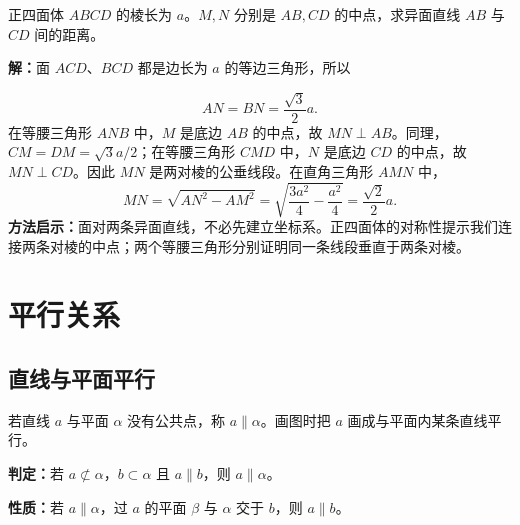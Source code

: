 \begin{examplebox}[补充：正四面体两对棱间的距离]
  正四面体 $ABCD$ 的棱长为 $a$。$M,N$ 分别是 $AB,CD$ 的中点，求异面直线 $AB$ 与 $CD$ 间的距离。

  \begin{center}
  \end{center}

  \textbf{解：}面 $ACD$、$BCD$ 都是边长为 $a$ 的等边三角形，所以

  \[
    AN=BN=\frac{\sqrt3}{2}a.
  \]
  在等腰三角形 $ANB$ 中，$M$ 是底边 $AB$ 的中点，故 $MN\perp AB$。同理，
  $CM=DM=\sqrt3a/2$；在等腰三角形 $CMD$ 中，$N$ 是底边 $CD$ 的中点，故
  $MN\perp CD$。因此 $MN$ 是两对棱的公垂线段。在直角三角形 $AMN$ 中，
  \[
    MN=\sqrt{AN^2-AM^2}
    =\sqrt{\frac{3a^2}{4}-\frac{a^2}{4}}
    =\boxed{\frac{\sqrt2}{2}a}.
  \]
  \textbf{方法启示：}面对两条异面直线，不必先建立坐标系。正四面体的对称性提示我们连接两条对棱的中点；两个等腰三角形分别证明同一条线段垂直于两条对棱。
\end{examplebox}

\section{平行关系}

\subsection{直线与平面平行}

若直线 $a$ 与平面 $\alpha$ 没有公共点，称 $a\parallel\alpha$。画图时把 $a$ 画成与平面内某条直线平行。

\begin{lawbox}[线面平行的判定与性质]
  \textbf{判定：}若 $a\not\subset\alpha$，$b\subset\alpha$ 且 $a\parallel b$，则 $a\parallel\alpha$。

  \textbf{性质：}若 $a\parallel\alpha$，过 $a$ 的平面 $\beta$ 与 $\alpha$ 交于 $b$，则 $a\parallel b$。
\end{lawbox}

